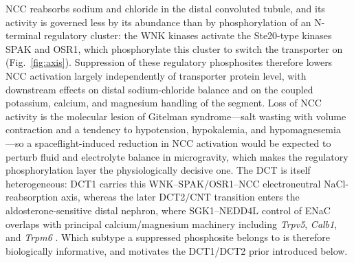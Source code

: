 \documentclass[11pt]{article}
\newcommand{\gene}[1]{\textit{#1}}
\begin{document}
NCC reabsorbs sodium and chloride in the distal convoluted tubule, and its activity is governed less by its abundance than by phosphorylation of an N-terminal regulatory cluster: the WNK kinases activate the Ste20-type kinases SPAK and OSR1, which phosphorylate this cluster to switch the transporter on \citep{vitari2005wnk,moriguchi2005wnk,richardson2008wnk,pachecoalvarez2006ncc} (Fig.~\ref{fig:axis}). Suppression of these regulatory phosphosites therefore lowers NCC activation largely independently of transporter protein level, with downstream effects on distal sodium-chloride balance and on the coupled potassium, calcium, and magnesium handling of the segment. Loss of NCC activity is the molecular lesion of Gitelman syndrome---salt wasting with volume contraction and a tendency to hypotension, hypokalemia, and hypomagnesemia \citep{gamba2005cct}---so a spaceflight-induced reduction in NCC activation would be expected to perturb fluid and electrolyte balance in microgravity, which makes the regulatory phosphorylation layer the physiologically decisive one. The DCT is itself heterogeneous: DCT1 carries this WNK--SPAK/OSR1--NCC electroneutral NaCl-reabsorption axis, whereas the later DCT2/CNT transition enters the aldosterone-sensitive distal nephron, where SGK1--NEDD4L control of ENaC overlaps with principal calcium/magnesium machinery including \gene{Trpv5}, \gene{Calb1}, and \gene{Trpm6} \citep{arroyo2011aldosterone,subramanya2014dct,su2024dct,loffing2001distal}. Which subtype a suppressed phosphosite belongs to is therefore biologically informative, and motivates the DCT1/DCT2 prior introduced below.
\end{document}
